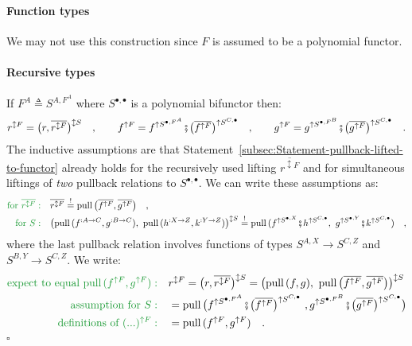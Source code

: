 \paragraph{Function types}

We may not use this construction since $F$ is assumed to be a polynomial
functor.

\paragraph{Recursive types}

If $F^{A}\triangleq S^{A,F^{A}}$ where $S^{\bullet,\bullet}$ is
a polynomial bifunctor then:
\[
r^{\updownarrow F}=\big(r,\overline{r^{\updownarrow F}}\big)^{\updownarrow S}\quad,\quad\quad f^{\uparrow F}=f^{\uparrow S^{\bullet,F^{A}}}\bef\big(\overline{f^{\uparrow F}}\big)^{\uparrow S^{C,\bullet}}\quad,\quad\quad g^{\uparrow F}=g^{\uparrow S^{\bullet,F^{B}}}\bef\big(\overline{g^{\uparrow F}}\big)^{\uparrow S^{C,\bullet}}\quad.
\]
The inductive assumptions are that Statement~\ref{subsec:Statement-pullback-lifted-to-functor}
already holds for the recursively used lifting $\overline{r^{\updownarrow F}}$
and for simultaneous liftings of \emph{two} pullback relations to
$S^{\bullet,\bullet}$. We can write these assumptions as:
\begin{align*}
{\color{greenunder}\text{for }\overline{r^{\updownarrow F}}:}\quad & \overline{r^{\updownarrow F}}\overset{!}{=}\text{pull}\,\big(\overline{f^{\uparrow F}},\overline{g^{\uparrow F}}\big)\quad,\\
{\color{greenunder}\text{for }S:}\quad & \big(\text{pull}\,(f^{:A\rightarrow C},g^{:B\rightarrow C}),\,\,\text{pull}\,(h^{:X\rightarrow Z},k^{:Y\rightarrow Z})\big)^{\updownarrow S}\overset{!}{=}\text{pull}\,(f^{\uparrow S^{\bullet,X}}\bef h^{\uparrow S^{C,\bullet}},\,\,g^{\uparrow S^{\bullet,Y}}\bef k^{\uparrow S^{C,\bullet}})\quad,
\end{align*}
where the last pullback relation involves functions of types $S^{A,X}\rightarrow S^{C,Z}$
and $S^{B,Y}\rightarrow S^{C,Z}$. We write:
\begin{align*}
{\color{greenunder}\text{expect to equal }\text{pull}\,(f^{\uparrow F},g^{\uparrow F}):}\quad & r^{\updownarrow F}=\big(r,\overline{r^{\updownarrow F}}\big)^{\updownarrow S}=\big(\text{pull}\,(f,g),\,\,\text{pull}\,\big(\overline{f^{\uparrow F}},\overline{g^{\uparrow F}}\big)\big)^{\updownarrow S}\\
{\color{greenunder}\text{assumption for }S:}\quad & =\text{pull}\,\big(f^{\uparrow S^{\bullet,F^{A}}}\bef\big(\overline{f^{\uparrow F}}\big)^{\uparrow S^{C,\bullet}}\,\,,g^{\uparrow S^{\bullet,F^{B}}}\bef\big(\overline{g^{\uparrow F}}\big)^{\uparrow S^{C,\bullet}}\big)\\
{\color{greenunder}\text{definitions of }(...)^{\uparrow F}:}\quad & =\text{pull}\,(f^{\uparrow F},g^{\uparrow F})\quad.
\end{align*}
$\square$

